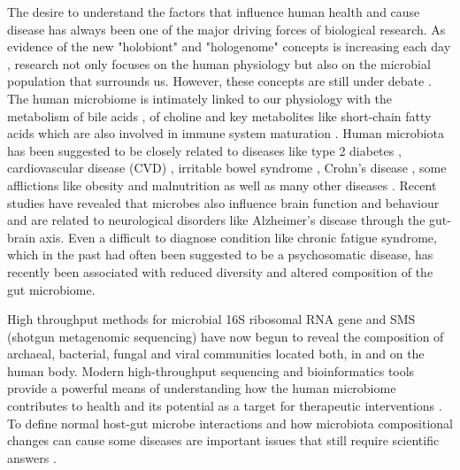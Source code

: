 The desire to understand the factors that influence human health and cause disease has always been one of the major driving forces of biological research. As evidence of the new "holobiont"  and "hologenome" concepts is increasing each day \cite{holo1, holo2}, research not only focuses on the human physiology but also on the microbial population that surrounds us. However, these concepts are still under debate \cite{holo3}. The human microbiome is intimately linked to our physiology with the metabolism of bile acids \cite{bileacids}, of choline \cite{choline} and key metabolites like short-chain fatty acids \cite{scfa1, scfa2} which are also involved in immune system maturation \cite{scfa3, scfa4}. Human microbiota has been suggested to be closely related to diseases like type 2 diabetes \cite{diabetes2}, cardiovascular disease (CVD) \cite{CVD}, irritable bowel syndrome \cite{IBS}, Crohn's disease \cite{CD}, some afflictions like obesity \cite{ob1, ob2} and malnutrition \cite{nutr} as well as many other diseases \cite{Moya_trends}. Recent studies have revealed that microbes also influence brain function and behaviour and are related to neurological disorders like Alzheimer's disease through the gut-brain axis\cite{mind,AD}. Even a difficult to diagnose condition like chronic fatigue syndrome, which in the past had often been suggested to be a psychosomatic disease, has recently been associated with reduced diversity and altered composition of the gut microbiome\cite{CFS}.

High throughput methods for microbial 16S ribosomal RNA gene and SMS (shotgun metagenomic sequencing) have now begun to reveal the composition of archaeal, bacterial, fungal and viral communities located both, in and on the human body. Modern high-throughput sequencing and bioinformatics tools provide a powerful means of understanding how the human microbiome contributes to health and its potential as a target for therapeutic interventions \cite{microb&health}. To define normal host-gut microbe interactions and how microbiota compositional changes can cause some diseases are important issues that still require scientific answers \cite{normal1, normal2, panthropology}.

